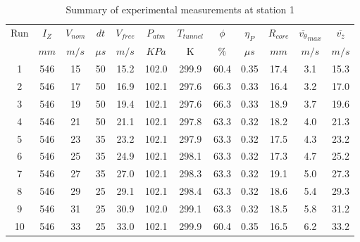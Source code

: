 \begin{table}[H]
\begin{center}
\begin{tabular}{|cccccccccccc|}
	\hline
	Run & $I_Z$ & $V_{nom}$ & $dt$ & $V_{free}$ & $P_{atm}$ & $T_{tunnel}$ & $\phi$ & $\eta_P$ & $R_{core}$ & $\overline{v_{\theta}}_{max}$ & $\overline{v_{\bar{z}}}$\\
	  & $mm$ & $m/s$ & $\mu s$ & $m/s$ & $KPa$ & K & $\%$ & $\mu s$ & $mm$ & $m/s$ & $m/s$\\
	\hline
	1 & 546 & 15 & 50 & 15.2 & 102.0 & 299.9 & 60.4 & 0.35 & 17.4 & 3.1 & 15.3\\
	2 & 546 & 17 & 50 & 16.9 & 102.1 & 297.6 & 66.3 & 0.33 & 16.4 & 3.2 & 17.0\\
	3 & 546 & 19 & 50 & 19.4 & 102.1 & 297.6 & 66.3 & 0.33 & 18.9 & 3.7 & 19.6\\
	4 & 546 & 21 & 50 & 21.1 & 102.1 & 297.8 & 63.3 & 0.32 & 18.2 & 4.0 & 21.3\\
	5 & 546 & 23 & 35 & 23.2 & 102.1 & 297.9 & 63.3 & 0.32 & 17.5 & 4.3 & 23.2\\
	6 & 546 & 25 & 35 & 24.9 & 102.1 & 298.1 & 63.3 & 0.32 & 17.3 & 4.7 & 25.2\\
	7 & 546 & 27 & 35 & 27.0 & 102.1 & 298.3 & 63.3 & 0.32 & 19.1 & 5.0 & 27.3\\
	8 & 546 & 29 & 25 & 29.1 & 102.1 & 298.4 & 63.3 & 0.32 & 18.6 & 5.4 & 29.3\\
	9 & 546 & 31 & 25 & 30.9 & 102.0 & 299.1 & 63.3 & 0.32 & 18.5 & 5.8 & 31.2\\
	10 & 546 & 33 & 25 & 33.0 & 102.1 & 299.9 & 60.4 & 0.35 & 16.5 & 6.2 & 33.2\\
	\hline
\end{tabular}
\caption{Summary of experimental measurements at station 1}
\label{table:experiment_results_1}
\end{center}
\end{table}
